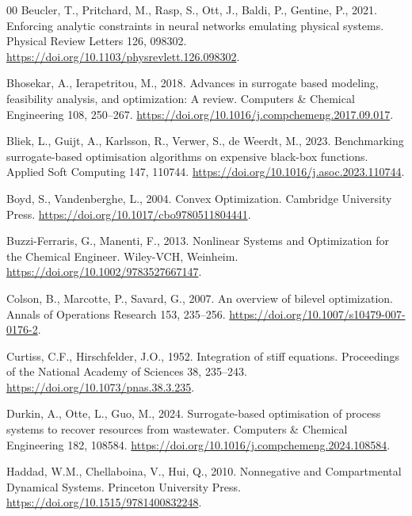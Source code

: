 \documentclass[a4paper,fleqn]{cas-sc}
\begin{document}
\begin{thebibliography}{00}
Beucler, T., Pritchard, M., Rasp, S., Ott, J., Baldi, P., Gentine, P., 2021. Enforcing analytic constraints in neural networks emulating physical systems. Physical Review Letters 126, 098302. \url{https://doi.org/10.1103/physrevlett.126.098302}.

Bhosekar, A., Ierapetritou, M., 2018. Advances in surrogate based modeling, feasibility analysis, and optimization: A review. Computers \& Chemical Engineering 108, 250--267. \url{https://doi.org/10.1016/j.compchemeng.2017.09.017}.

Bliek, L., Guijt, A., Karlsson, R., Verwer, S., de Weerdt, M., 2023. Benchmarking surrogate-based optimisation algorithms on expensive black-box functions. Applied Soft Computing 147, 110744. \url{https://doi.org/10.1016/j.asoc.2023.110744}.

Boyd, S., Vandenberghe, L., 2004. Convex Optimization. Cambridge University Press. \url{https://doi.org/10.1017/cbo9780511804441}.

Buzzi-Ferraris, G., Manenti, F., 2013. Nonlinear Systems and Optimization for the Chemical Engineer. Wiley-VCH, Weinheim. \url{https://doi.org/10.1002/9783527667147}.

Colson, B., Marcotte, P., Savard, G., 2007. An overview of bilevel optimization. Annals of Operations Research 153, 235--256. \url{https://doi.org/10.1007/s10479-007-0176-2}.

Curtiss, C.F., Hirschfelder, J.O., 1952. Integration of stiff equations. Proceedings of the National Academy of Sciences 38, 235--243. \url{https://doi.org/10.1073/pnas.38.3.235}.

Durkin, A., Otte, L., Guo, M., 2024. Surrogate-based optimisation of process systems to recover resources from wastewater. Computers \& Chemical Engineering 182, 108584. \url{https://doi.org/10.1016/j.compchemeng.2024.108584}.

Haddad, W.M., Chellaboina, V., Hui, Q., 2010. Nonnegative and Compartmental Dynamical Systems. Princeton University Press. \url{https://doi.org/10.1515/9781400832248}.


\end{thebibliography}
\end{document}
